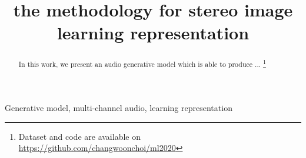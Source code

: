 \documentclass{article}
\title{the methodology for stereo image learning representation}
\begin{document}
\maketitle

\begin{abstract}
In this work, we present an audio generative model which is able to produce ... 
\footnote{Dataset and code are available on \url{https://github.com/changwoonchoi/ml2020}}
\end{abstract}

\begin{keywords}
Generative model, multi-channel audio, learning representation
\end{keywords}









\end{document}
